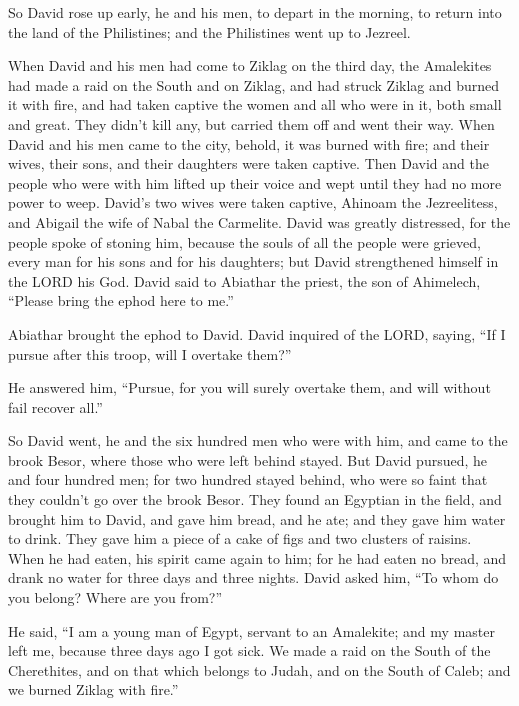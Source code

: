 \myverse{}So David rose up early, he and his men, to depart in the morning,
to return into the land of the Philistines; and the Philistines went up to Jezreel.


\mychapter{} \myverse*{}When David and his men had come to Ziklag on the third day, the
Amalekites had made a raid on the South and on Ziklag, and had struck Ziklag and burned it with fire,
\myverse{}and had taken captive the women and all who were in it, both small and great.
They didn’t kill any, but carried them off and went their way.
\myverse{}When David and his men came to the city, behold, it was burned with fire; and
their wives, their sons, and their daughters were taken captive.
\myverse{}Then David and the people who were with him lifted up their voice and wept
until they had no more power to weep.
\myverse{}David’s two wives were taken captive, Ahinoam the Jezreelitess, and Abigail
the wife of Nabal the Carmelite.
\myverse{}David was greatly distressed, for the people spoke of stoning him, because
the souls of all the people were grieved, every man for his sons and for his daughters; but David strengthened
himself in the LORD his God.
\myverse{}David said to Abiathar the priest, the son of Ahimelech, “Please bring the
ephod here to me.”

Abiathar brought the ephod to David.
\myverse{}David inquired of the LORD, saying, “If I pursue after this troop, will I overtake
them?”

He answered him, “Pursue, for you will surely overtake them, and will without fail recover
all.”

\myverse{}So David went, he and the six hundred men who were with him, and
came to the brook Besor, where those who were left behind stayed.
\myverse{}But David pursued, he and four hundred men; for two hundred stayed behind,
who were so faint that they couldn’t go over the brook Besor.
\myverse{}They found an Egyptian in the field, and brought him to David, and gave him
bread, and he ate; and they gave him water to drink.
\myverse{}They gave him a piece of a cake of figs and two clusters of raisins. When
he had eaten, his spirit came again to him; for he had eaten no bread, and drank no water for three days
and three nights.
\myverse{}David asked him, “To whom do you belong? Where are you from?”

He said, “I am a young man of Egypt, servant to an Amalekite; and my master left me, because
three days ago I got sick.
\myverse{}We made a raid on the South of the Cherethites, and on that which belongs
to Judah, and on the South of Caleb; and we burned Ziklag with fire.”

